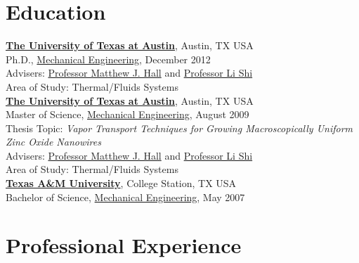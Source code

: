 \documentclass[centered]{res}
\begin{document}
\begin{resume}
\section{Education}
%
\href{http://www.utexas.edu/}{\textbf{The University of Texas at
    Austin}}, Austin, TX USA \\
Ph.D., \href{http://www.me.utexas.edu/}{Mechanical Engineering},
December 2012 \\
Advisers:
\href{http://www.me.utexas.edu/directory/faculty/hall/matthew/33/}{Professor
  Matthew J. Hall} and \href{http://www.me.utexas.edu/~lishi/}{Professor Li Shi}\\
Area of Study: Thermal/Fluids Systems \\
%
\href{http://www.utexas.edu/}{\textbf{The University of Texas at
    Austin}}, Austin, TX USA \\
Master of Science, \href{http://www.me.utexas.edu/}{Mechanical
  Engineering}, August
2009 \\
Thesis Topic: \emph{Vapor Transport Techniques for Growing
  Macroscopically Uniform Zinc Oxide Nanowires} \\
Advisers:
\href{http://www.me.utexas.edu/directory/faculty/hall/matthew/33/}{Professor
  Matthew J. Hall} and \href{http://www.me.utexas.edu/~lishi/}{Professor Li Shi}\\
Area of Study: Thermal/Fluids Systems \\
%
\href{http://www.tamu.edu/}{\textbf{Texas A\&M University}}, College
Station, TX USA \\
Bachelor of Science, \href{http://www.mengr.tamu.edu/}{Mechanical
  Engineering}, May
2007  \\

\section{Professional Experience}


\end{resume}
\end{document}

